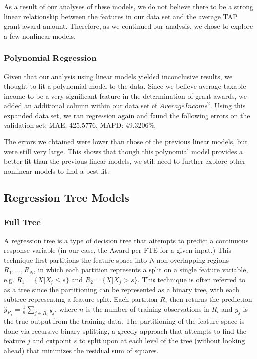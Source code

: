 \documentclass[12pt, fleqn]{article}
\begin{document}
	As a result of our analyses of these models, we do not believe there to be a strong linear relationship between the features in our data set and the average TAP grant award amount. Therefore, as we continued our analysis, we chose to explore a few nonlinear models.

\subsubsection{Polynomial Regression}
	Given that our analysis using linear models yielded inconclusive results, we thought to fit a polynomial model to the data. Since we believe average taxable income to be a very significant feature in the determination of grant awards, we added an additional column within our data set of ${AverageIncome}^2$. Using this expanded data set, we ran regression again and found the following errors on the validation set: MAE: 425.5776, MAPD: 49.3206\%. 
	
	The errors we obtained were lower than those of the previous linear models, but were still very large. This shows that though this polynomial model provides a better fit than the previous linear models, we still need to further explore other nonlinear models to find a best fit.


\subsection{Regression Tree Models}

\subsubsection{Full Tree}
	A regression tree is a type of decision tree that attempts to predict a continuous response variable (in our case, the Award per FTE for a given input.) This technique first partitions the feature space into $N$ non-overlapping regions $R_1, \dots, R_N$, in which each partition represents a split on a single feature variable, e.g. $R_1 = \{ X | X_j \leq s\}$ and $R_2 = \{X | X_j > s\}$. This technique is often referred to as a tree since the partitioning can be represented as a binary tree, with each subtree representing a feature split. Each partition $R_i$ then returns the prediction $\hat{y}_{R_i} = \tfrac{1}{n} \sum_{j\in R_i} y_j$, where $n$ is the number of training observations in $R_i$ and $y_j$ is the true output from the training data. The partitioning of the feature space is done via recursive binary splitting, a greedy approach that attempts to find the feature $j$ and cutpoint $s$ to split upon at each level of the tree (without looking ahead) that minimizes the residual sum of squares. 
\end{document}
